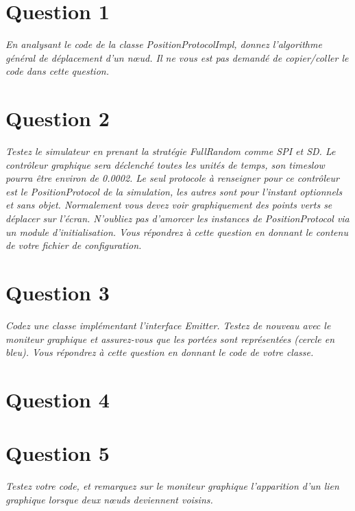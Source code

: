 \documentclass[11pt,a4paper,sans]{report}
\begin{document}
\section{Question 1}
\textit{En analysant le code de la classe PositionProtocolImpl, donnez l’algorithme général de déplacement d’un nœud. Il ne vous est pas demandé de copier/coller le code dans cette question.}




\section{Question 2}
\textit{Testez le simulateur en prenant la stratégie FullRandom comme SPI et SD. Le contrôleur graphique sera déclenché toutes les unités de temps, son timeslow pourra être environ de 0.0002. Le seul protocole à renseigner pour ce contrôleur est le PositionProtocol de la simulation, les autres sont pour l’instant optionnels et sans objet.  Normalement vous devez voir graphiquement des points verts se déplacer sur l’écran.  N’oubliez pas d’amorcer les instances de PositionProtocol via un module d’initialisation. Vous répondrez à cette question en donnant le contenu de votre fichier de configuration.}

\section{Question 3}
\textit{Codez une classe implémentant l’interface Emitter. Testez de nouveau avec le moniteur graphique et assurez-vous que les portées sont représentées (cercle en bleu).  Vous répondrez à cette question en donnant le code de votre classe.}
%


\section{Question 4}

\section{Question 5}
\textit{Testez votre code, et remarquez sur le moniteur graphique l’apparition d’un lien graphique lorsque deux nœuds deviennent voisins.} %
\end{document}
